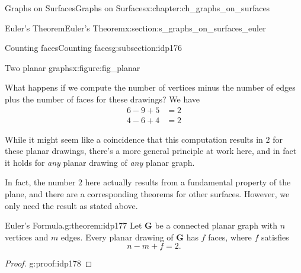 \documentclass[oneside,10pt,]{book}
\numberwithin{equation}{section}
\newcommand{\bfG}{\mathbf{G}}
\newcommand{\amp}{&}
\begin{document}
\begin{chapterptx}{Graphs on Surfaces}{}{Graphs on Surfaces}{}{}{x:chapter:ch_graphs_on_surfaces}
\begin{sectionptx}{Euler's Theorem}{}{Euler's Theorem}{}{}{x:section:s_graphs_on_surfaces_euler}
\begin{subsectionptx}{Counting faces}{}{Counting faces}{}{}{g:subsection:idp176}
\begin{figureptx}{Two planar graphs}{x:figure:fig_planar}{}
\begin{image}{0}{1}{0}
{
}%
\end{image}%
\tcblower
\end{figureptx}%
What happens if we compute the number of vertices minus the number of edges plus the number of faces for these drawings? We have%
\begin{align*}
6-9+5 \amp = 2\\
4-6+4 \amp =2
\end{align*}
%
\par
While it might seem like a coincidence that this computation results in \(2\) for these planar drawings, there's a more general principle at work here, and in fact it holds for \emph{any} planar drawing of \emph{any} planar graph.%
\par
In fact, the number \(2\) here actually results from a fundamental property of the plane, and there are a corresponding theorems for other surfaces. However, we only need the result as stated above.%
\begin{theorem}{Euler's Formula.}{}{g:theorem:idp177}%
%
Let \(\bfG\) be a connected planar graph with \(n\) vertices and \(m\) edges. Every planar drawing of \(\bfG\) has \(f\) faces, where \(f\) satisfies%
\begin{equation*}
n-m+f=2.
\end{equation*}
%
\end{theorem}
\begin{proof}{}{g:proof:idp178}

\end{proof}
\end{subsectionptx}
\end{sectionptx}
\end{chapterptx}
\end{document}
